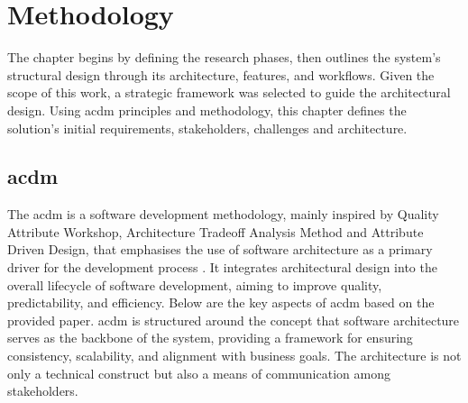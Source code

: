\chapter{Methodology}
\label{chapter:methodology}

The chapter begins by defining the research phases, then outlines the system's structural design through its architecture, features, and workflows. Given the scope of this work, a strategic framework was selected to guide the architectural design. Using \ac{acdm} principles and methodology, this chapter defines the solution's initial requirements, stakeholders, challenges and architecture.






\section{\acl{acdm}} \label{section:acdm}

The \ac{acdm} is a software development methodology, mainly inspired by Quality Attribute Workshop, Architecture Tradeoff Analysis Method and Attribute Driven Design, that emphasises the use of software architecture as a primary driver for the development process \cite{Lattanze2005}. It integrates architectural design into the overall lifecycle of software development, aiming to improve quality, predictability, and efficiency. Below are the key aspects of \ac{acdm} based on the provided paper. \ac{acdm} is structured around the concept that software architecture serves as the backbone of the system, providing a framework for ensuring consistency, scalability, and alignment with business goals. The architecture is not only a technical construct but also a means of communication among stakeholders.

